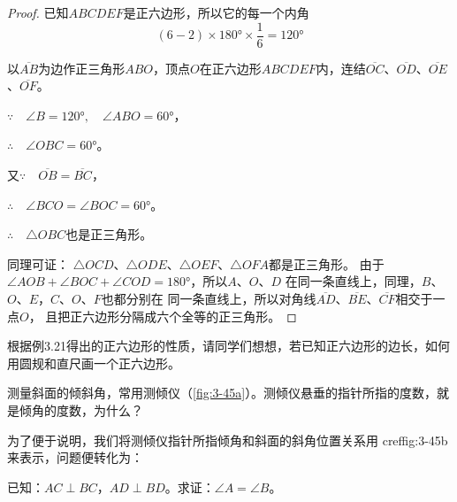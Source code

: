 \begin{proof}
已知$ABCDEF$是正六边形，所以它的每一个内角
\[(6-2)\times \ang{180} \times \frac{1}{6}=\ang{120}\]

以$\overline{AB}$为边作正三角形$ABO$，顶点$O$在正六边形$ABCD
EF$内，连结$\overline{OC}$、$\overline{OD}$、$\overline{OE}$、$\overline{OF}$。

$\because\quad \angle B=\ang{120},\quad \angle ABO=\ang{60}$，
 
$\therefore\quad \angle OBC=\ang{60}$。

又$\because\quad \overline{OB}=\overline{BC}$，

$\therefore\quad \angle BCO=\angle BOC=\ang{60}$。

$\therefore\quad \triangle OBC$也是正三角形。

同理可证：
$\triangle OCD$、$\triangle ODE$、$\triangle OEF$、$\triangle OFA$都是正三角形。
由于$\angle AOB+\angle BOC+\angle COD=\ang{180}$，所以$A$、$O$、$D$
在同一条直线上，同理，$B$、$O$、$E$，$C$、$O$、$F$也都分别在
同一条直线上，所以对角线$\overline{AD}$、$\overline{BE}$、$\overline{CF}$相交于一点$O$，
且把正六边形分隔成六个全等的正三角形。
\end{proof}


根据例3.21得出的正六边形的性质，请同学们想想，若已知正六边形的边长，如何用圆规和直尺画一个正六边形。
    


\begin{example}
测量斜面的倾斜角，常用测倾仪（\cref{fig:3-45a}）。测倾仪悬垂的指针所指的度数，就是倾角的度数，为什么？
\begin{figure}
  \begin{minipage}[b]{0.45\linewidth}\centering
    \subcaption{}\label{fig:3-45a}
  \end{minipage}
  \begin{minipage}[b]{0.45\linewidth}\centering
    \subcaption{}\label{fig:3-45b}
  \end{minipage}
\caption{}\label{fig:3-45}
\end{figure}
\end{example}


\begin{analyze}
为了便于说明，我们将测倾仪指针所指倾角和斜面的斜角位置关系用 cref{fig:3-45b} 来表示，问题便转化为：

已知：$AC\perp BC$，$AD\perp BD$。求证：$\angle A=\angle B$。
\end{analyze}

